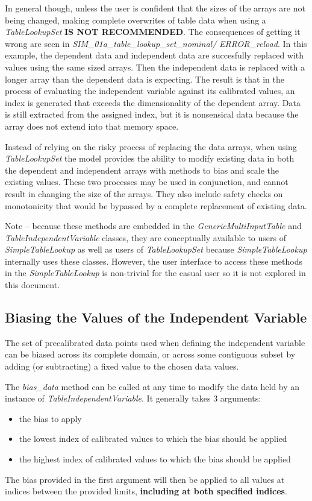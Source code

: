 \documentclass[11pt,fleqn]{report}
\begin{document}
In general though, unless the user is confident that the sizes of the arrays
are not being changed, making complete overwrites of table data when using a
\textit{TableLookupSet} \textbf{IS NOT RECOMMENDED}.
The consequences of getting it
wrong are seen in \textit{SIM\_01a\_table\_lookup\_set\_nominal/}
\textit{ERROR\_reload}.
In this example, the dependent data and independent data are succesfully
replaced with values using the same sized arrays. Then the independent data is
replaced with a longer array than the dependent data is expecting. The result
is that in the process of evaluating the independent variable against
its calibrated values, an index is generated that exceeds the dimensionality of
the dependent array. Data is still extracted from the assigned index, but it is
nonsensical data because the array does not extend into that memory space.

Instead of relying on the risky process of replacing the data arrays, when
using \textit{TableLookupSet} the model provides the ability to modify existing
data in both the dependent and independent arrays with methods to bias and
scale the existing values. These two processes may be used in conjunction, and
cannot result in changing the size of the arrays. They also include safety
checks on monotonicity that would be bypassed by a complete replacement of
existing data.

Note -- because these methods are embedded in the
\textit{GenericMultiInputTable} and \textit{TableIndependentVariable} classes,
they are conceptually available to users of \textit{SimpleTableLookup} as well
as users of \textit{TableLookupSet} because \textit{SimpleTableLookup}
internally uses these classes. However, the user interface to access these
methods in the \textit{SimpleTableLookup} is non-trivial for the casual user so
it is not explored in this document.

\subsection {Biasing the Values of the Independent Variable}

The set of precalibrated data points used when defining the independent
variable can be biased across its complete domain, or across some contiguous
subset by adding (or subtracting) a fixed value to the chosen data values.

The \textit{bias\_data} method can be called at any time to modify the data
held by an instance of \textit{TableIndependentVariable}.  It generally takes
3 arguments:
\begin{itemize}
\item the bias to apply
\item the lowest index of calibrated values to which the bias should be
applied
\item the highest index of calibrated values to which the bias should be
applied
\end{itemize}
The bias provided in the first argument will then be applied to all values at
indices between the provided limits, \textbf{including at both specified
indices}.
\end{document}
